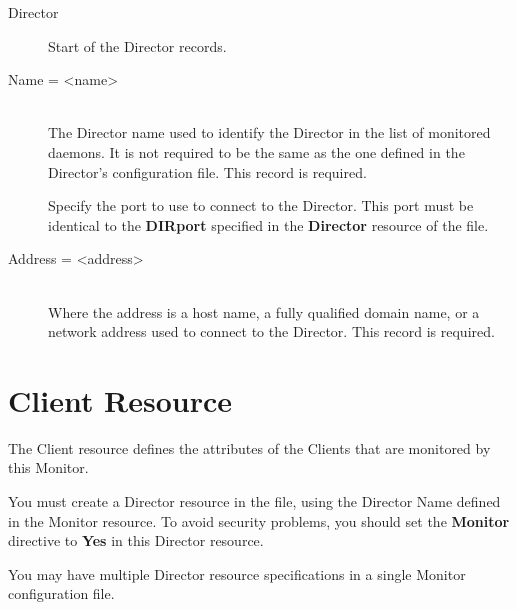 \begin{description}

\item [Director]
Start of the Director records.

\item [Name = {\textless}name{\textgreater}] \hfill \\
The Director name used to identify  the Director in the list of monitored
daemons. It is not required  to be the same as the one defined in the Director's
configuration file.  This record is required.

Specify the port to use to connect  to the Director.
This port must be
identical to the  {\bf DIRport} specified in the {\bf Director} resource of the
 file.

\item [Address = {\textless}address{\textgreater}] \hfill \\
Where the address is a host name,  a fully qualified domain name, or a network
address used to connect  to the Director.  This record is required.
\end{description}

\section{Client Resource}
\label{ClientResource1}

The Client resource defines the attributes of the Clients that are monitored
by this Monitor.

You must create a Director resource in the
 file, using the
Director Name defined in the Monitor resource. To avoid security problems, you
should set the {\bf Monitor} directive to {\bf Yes} in this Director resource.


You may have multiple Director resource specifications in a single Monitor
configuration file.

